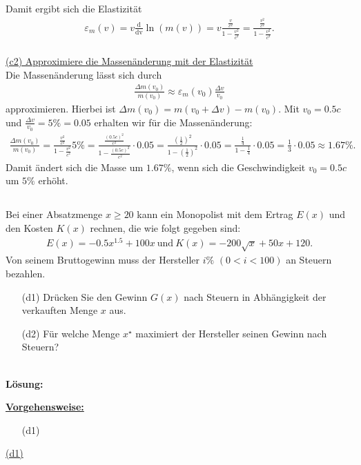 Damit ergibt sich die Elastizität 
\begin{align*}
	\varepsilon_m(v) = v \frac{\mathrm{d}}{\mathrm{dv}}\ln(m(v))=
	v \frac{\frac{v}{c^2}}{1 - \frac{v^2}{c^2}}
	=\frac{\frac{v^2}{c^2}}{1 - \frac{v^2}{c^2}}.
\end{align*}
\ \\
\underline{(c2) Approximiere die Massenänderung mit der Elastizität}\\
Die Massenänderung lässt sich durch 
\begin{align*}
	\frac{\Delta m(v_0)}{m(v_0)}
	\approx 
	\varepsilon_m(v_0) \frac{\Delta v}{v_0}
\end{align*}
approximieren. Hierbei ist $  \Delta m(v_0) = m(v_0 + \Delta v) - m(v_0)$.
Mit $ v_0 = 0.5 c $ und $ \frac{\Delta v}{v_0}  = 5 \% = 0.05$ erhalten wir für die Massenänderung:
\begin{align*}
	\frac{\Delta m(v_0)}{m(v_0)}
	=
	\frac{\frac{v^2}{c^2}}{1 - \frac{v^2}{c^2}} 5 \%
	=
	\frac{\frac{(0.5 c)^2}{c^2}}{1 - \frac{(0.5 c)^2}{c^2}} \cdot 0.05
	=
	\frac{\left(\frac{1}{2}\right)^2}{1 - \left(\frac{1}{2}\right)^2}\cdot 0.05
	=
	\frac{\frac{1}{4}}{1- \frac{1}{4}} \cdot 0.05
	=
	\frac{1}{3} \cdot 0.05 \approx 1.67 \%.
\end{align*}
Damit ändert sich die Masse um $ 1.67 \% $, wenn sich die Geschwindigkeit $ v_0 =0.5 c $ um $ 5 \% $ erhöht.


\newpage
\subsection*{}
Bei einer Absatzmenge $ x \geq 20  $ kann ein Monopolist mit dem Ertrag $ E(x) $ und den Kosten $ K(x) $ rechnen, die wie folgt gegeben sind:
\begin{align*}
	E(x) = -0.5 x^{1.5} +100 x \ \textrm{und} \ K(x) = -200\sqrt{x} + 50 x +120.
\end{align*}
Von seinem Bruttogewinn muss der Hersteller $ i \% $  $ (0 < i < 100) $ an Steuern bezahlen.
\begin{enumerate}
	\item[(d1)]
	Drücken Sie den Gewinn $ G(x) $ nach Steuern in Abhängigkeit der verkauften Menge $ x $ aus.
	\item[(d2)] 
	Für welche Menge $ x^\star $ maximiert der Hersteller seinen Gewinn nach Steuern?
\end{enumerate}
\ \\
\textbf{Lösung:}
\begin{mdframed}
	\underline{\textbf{Vorgehensweise:}}
	\begin{enumerate}
		\item[(d1)] 
	\end{enumerate}
\end{mdframed}


\underline{(d1) }\\





